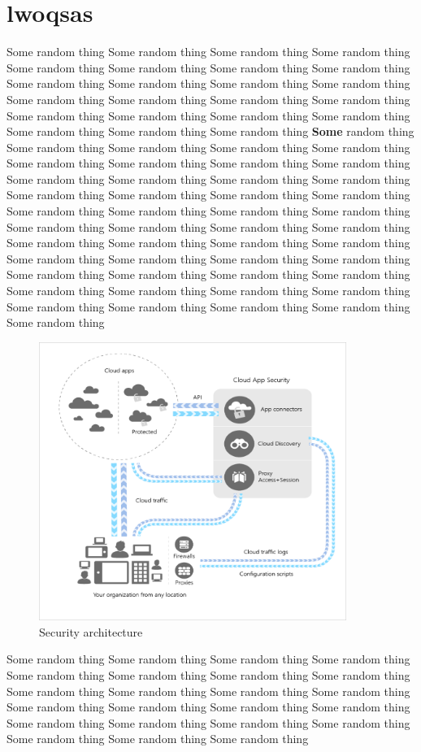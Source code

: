 \section{lwoqsas}
Some random thing Some random thing Some random thing Some random thing Some random thing Some random thing Some random thing Some random thing Some random thing Some random thing Some random thing Some random thing Some random thing Some random thing Some random thing Some random thing Some random thing Some random thing Some random thing Some random thing Some random thing Some random thing Some random thing  \newline 
\textbf{Some} random thing Some random thing Some random thing Some random thing Some random thing Some random thing Some random thing Some random thing Some random thing Some random thing Some random thing Some random thing Some random thing Some random thing Some random thing Some random thing Some random thing Some random thing Some random thing Some random thing Some random thing Some random thing Some random thing  \cite{microsoft}
Some random thing Some random thing Some random thing Some random thing Some random thing Some random thing Some random thing Some random thing Some random thing Some random thing Some random thing Some random thing Some random thing Some random thing Some random thing Some random thing Some random thing Some random thing Some random thing Some random thing Some random thing Some random thing Some random thing  
\begin{figure}[h]
\begin{center}
\includegraphics[width=10cm]{texfiles/images/proxy-architecture.png}
  \caption{Security architecture \protect\cite{WhatisCl88:online}}
  \label{fig:my_label}
\end{center}
\end{figure}
Some random thing Some random thing Some random thing Some random thing Some random thing Some random thing Some random thing Some random thing Some random thing Some random thing Some random thing Some random thing Some random thing Some random thing Some random thing Some random thing Some random thing Some random thing Some random thing Some random thing Some random thing Some random thing Some random thing  
